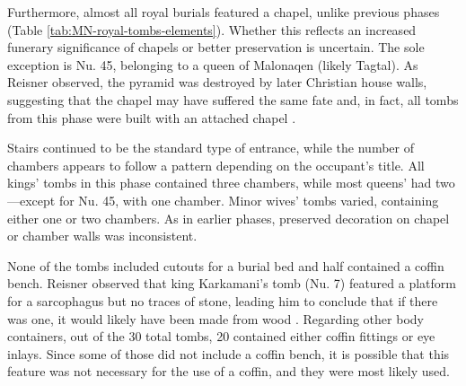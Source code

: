 Furthermore, almost all royal burials featured a chapel, unlike  previous phases (Table \ref{tab:MN-royal-tombs-elements}). Whether this reflects an increased funerary significance of chapels or better preservation is uncertain. The sole exception is Nu. 45, belonging to a queen of Malonaqen (likely Tagtal). As Reisner observed, the pyramid was destroyed by later Christian house walls, suggesting that the chapel may have suffered the same fate and, in fact, all tombs from this phase were built with an attached chapel \parencites[p.~149]{dunhamNuri1955}.


Stairs continued to be the standard type of entrance, while the number of chambers appears to follow a pattern depending on the occupant's title. All kings' tombs in this phase contained three chambers, while most queens' had two---except for Nu. 45, with one chamber. Minor wives' tombs varied, containing either one or two chambers. As in earlier phases, preserved decoration on chapel or chamber walls was inconsistent.


None of the tombs included cutouts for a burial bed and half contained a coffin bench. Reisner observed that king Karkamani's tomb (Nu. 7) featured a platform for a sarcophagus but no traces of stone, leading him to conclude that if there was one, it would likely have been made from wood \parencites[p.~161]{dunhamNuri1955}. Regarding other body containers, out of the 30 total tombs, 20 contained either coffin fittings or eye inlays. Since some of those did not include a coffin bench, it is possible that this feature was not necessary for the use of a coffin, and they were most likely used.


